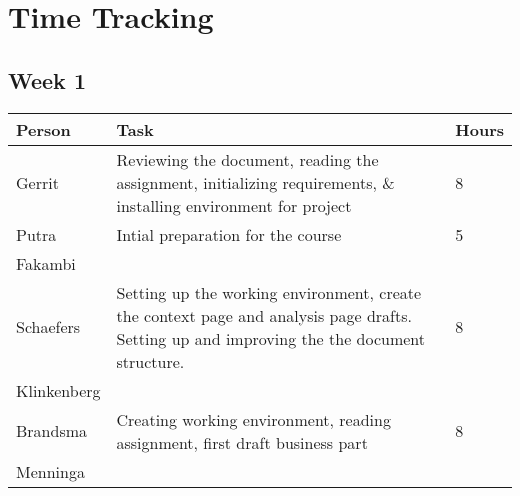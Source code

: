 \chapter{Time Tracking}
\label{App: Time Tracking}

\section{Week 1}
\begin{tabular}{p{} p{} p{}}
    \textbf{Person} & \textbf{Task} & \textbf{Hours} \\ \hline
	Gerrit & Reviewing the document, reading the assignment, initializing requirements, \& installing environment for project & 8 \\ \hline
	Putra & Intial preparation for the course & 5 \\ \hline
	Fakambi & & \\ \hline
	Schaefers & Setting up the working environment, create the context page and analysis page drafts. Setting up and improving the the document structure. & 8\\ \hline
	Klinkenberg & & \\ \hline
	Brandsma & Creating working environment, reading assignment, first draft business part & 8\\ \hline
	Menninga & & \\ \hline
\end{tabular}